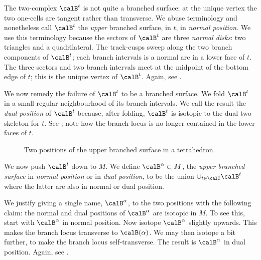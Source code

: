 \documentclass[12pt]{amsart}
\begin{document}
The two-complex $\calB^t$ is not quite a branched surface; at the unique vertex the two one-cells are tangent rather than transverse.  We abuse terminology and nonetheless call $\calB^t$ the \emph{upper} branched surface, in $t$, in \emph{normal position}.  We use this terminology because the sectors of $\calB^t$ are three \emph{normal disks}: two triangles and a quadrilateral.  The track-cusps sweep along the two branch components of  $\calB^t$; each branch intervals is a normal arc in a lower face of $t$.  The three sectors and two branch intervals meet at the midpoint of the bottom edge of $t$; this is the unique vertex of $\calB^t$.  Again, see .

We now remedy the failure of $\calB^t$ to be a branched surface.  We fold $\calB^t$ in a small regular neighbourhood of its branch intervals.  We call the result the \emph{dual position} of $\calB^t$ because, after folding, $\calB^t$ is isotopic to the dual two-skeleton for $t$.  See ; note how the branch locus is no longer contained in the lower faces of $t$.   

\begin{figure}[htb]
\centering
{}
\caption{Two positions of the upper branched surface in a tetrahedron.}
\label{Fig:UpperBranchedSurface}
\end{figure}

We now push $\calB^t$ down to $M$.  We define $\calB^\alpha \subset M$, the \emph{upper branched surface} in \emph{normal position} or in \emph{dual position}, to be the union $\cup_{t \in \calT} \calB^t$ where the latter are also in normal or dual position.  

\begin{remark}
\label{Rem:Shift}
We justify giving a single name, $\calB^\alpha$, to the two positions with the following claim: the normal and dual positions of $\calB^\alpha$ are isotopic in $M$.  To see this, start with $\calB^\alpha$ in normal position.  Now isotope $\calB^\alpha$ slightly upwards.  This makes the branch locus transverse to $\calB(\alpha)$.  We may then isotope a bit further, to make the branch locus self-transverse.  The result is $\calB^\alpha$ in dual position.  Again, see .
\end{remark}
\end{document}

